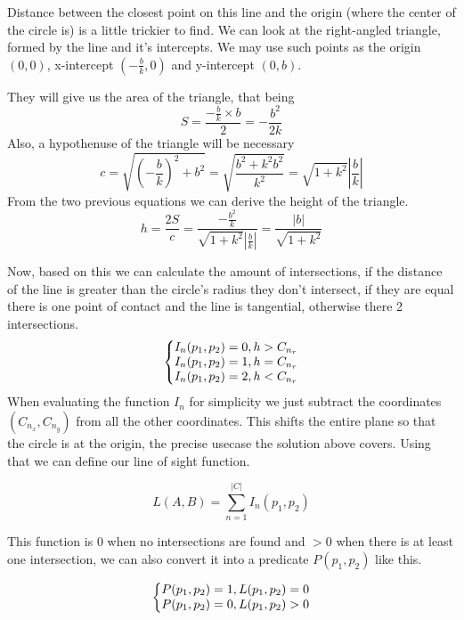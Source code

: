 \documentclass[12pt, titlepage]{article}
\begin{document}
Distance between the closest point on this line and the origin (where the center
of the circle is) is a little trickier to find. We can look at the right-angled triangle, formed
by the line and it's intercepts. We may use such points as the origin $(0, 0)$, 
x-intercept $(-\frac{b}{k}, 0)$ and y-intercept $(0, b)$.

They will give us the area of the triangle, that being
\begin{equation}
    S = \frac{-\frac{b}{k} \times b}{2}  = -\frac{b^2}{2k}
\end{equation}
Also, a hypothenuse of the triangle will be necessary
\begin{equation}
    c = \sqrt{\left(-\frac{b}{k}\right)^2 + b^2} = \sqrt{\frac{b^2 + k^2b^2}{k^2}} = \sqrt{1+k^2}\left|\frac{b}{k}\right|
\end{equation}
From the two previous equations we can derive the height of the triangle.
\begin{equation}
    h = \frac{2S}{c} = \frac{-\frac{b^2}{k}}{\sqrt{1+k^2}\left|\frac{b}{k}\right|} = \frac{|b|}{\sqrt{1 + k^2}}
\end{equation}

Now, based on this we can calculate the amount of intersections, if the distance
of the line is greater than the circle's radius they don't intersect,
if they are equal there is one point of contact and the line is tangential,
otherwise there 2 intersections.
\begin{equation}
    \left\{\begin{array}{@{}l@{}}
       I_n(p_1, p_2) = 0, h > C_{n_r}\\
       I_n(p_1, p_2) = 1, h = C_{n_r}\\
       I_n(p_1, p_2) = 2, h < C_{n_r}
    \end{array}\right.
\end{equation}
When evaluating the function $I_n$ for simplicity we just subtract the 
coordinates $(C_{n_x}, C_{n_y})$ from all the other coordinates. This shifts 
the entire plane so that the circle is at the origin, the precise usecase the
solution above covers. Using that we can define our line of sight function.

$$L(A, B) = \sum^{|C|}_{n=1}I_n(p_1, p_2)$$

This function is 0 when no intersections are found and $> 0$ when there is
at least one intersection, we can also convert it into a predicate $P(p_1, p_2)$ like this.

\begin{equation}
    \left\{\begin{array}{@{}l@{}}
       P(p_1, p_2) = 1, L(p_1, p_2) = 0\\
       P(p_1, p_2) = 0, L(p_1, p_2) > 0\\
    \end{array}\right.
\end{equation}
\end{document}
